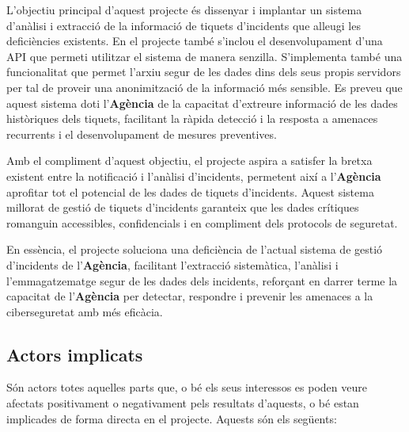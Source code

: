 L'objectiu principal d'aquest projecte és dissenyar i implantar un sistema d'anàlisi i extracció de la informació de tiquets d'incidents que alleugi les deficiències existents. En el projecte també s'inclou el desenvolupament d'una API que permeti utilitzar el sistema de manera senzilla. S'implementa també una funcionalitat que permet l'arxiu segur de les dades dins dels seus propis servidors per tal de proveir una anonimització de la informació més sensible. Es preveu que aquest sistema doti l'\textbf{Agència} de la capacitat d'extreure informació de les dades històriques dels tiquets, facilitant la ràpida detecció i la resposta a amenaces recurrents i el desenvolupament de mesures preventives.

Amb el compliment d'aquest objectiu, el projecte aspira a satisfer la bretxa existent entre la notificació i l'anàlisi d'incidents, permetent així a l'\textbf{Agència} aprofitar tot el potencial de les dades de tiquets d'incidents. Aquest sistema millorat de gestió de tiquets d'incidents garanteix que les dades crítiques romanguin accessibles, confidencials i en compliment dels protocols de seguretat. 

En essència, el projecte soluciona una deficiència de l'actual sistema de gestió d'incidents de l'\textbf{Agència}, facilitant l'extracció sistemàtica, l'anàlisi i l'emmagatzematge segur de les dades dels incidents, reforçant en darrer terme la capacitat de l'\textbf{Agència} per detectar, respondre i prevenir les amenaces a la ciberseguretat amb més eficàcia.


\subsection{Actors implicats}
Són actors totes aquelles parts que, o bé els seus interessos es poden veure afectats positivament o negativament pels resultats d'aquests, o bé estan implicades de forma directa en el projecte. Aquests són els següents:


